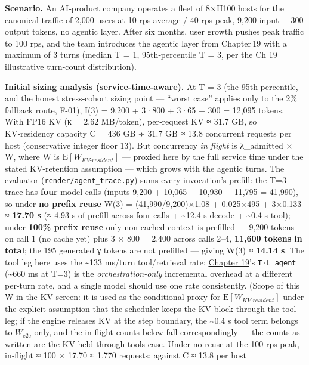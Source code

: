 \textbf{Scenario.} An AI‑product company operates a fleet of 8×H100
hosts for the canonical traffic of 2,000 users at 10 rps average / 40
rps peak, 9,200 input + 300 output tokens, no agentic layer. After six
months, user growth pushes peak traffic to 100 rps, and the team
introduces the agentic layer from Chapter\,19 with a maximum of 3 turns
(median T = 1, 95th‑percentile T = 3, per the Ch 19 illustrative
turn-count distribution).

\textbf{Initial sizing analysis (service-time-aware).} At T = 3 (the
95th‑percentile, and the honest stress‑cohort sizing point --- ``worst
case'' applies only to the 2\% fallback route, F-01), I(3) = 9,200 +
3·800 + 3·65 + 300 = 12,095 tokens. With FP16 KV (κ = 2.62 MB/token),
per‑request KV ≈ 31.7 GB, so KV‑residency capacity C = 436 GB ÷ 31.7 GB
≈ 13.8 concurrent requests per host (conservative integer floor 13). But
concurrency \emph{in flight} is λ\_admitted × W, where W is
\(\mathrm{E}[W_{KV\text{-}resident}]\) --- proxied here by the full
service time under the stated KV-retention assumption --- which grows
with the agentic turns. The evaluator (\texttt{render/agent\_trace.py})
sums every invocation's prefill: the T=3 trace has \textbf{four} model
calls (inputs 9,200 + 10,065 + 10,930 + 11,795 = 41,990), so under
\textbf{no prefix reuse} W(3) = (41,990/9,200)×1.08 + 0.025×495 +
3×0.133 ≈ \textbf{17.70 s} (≈ 4.93 s of prefill across four calls +
\textasciitilde12.4 s decode + \textasciitilde0.4 s tool); under
\textbf{100\% prefix reuse} only non-cached context is prefilled ---
9,200 tokens on call 1 (no cache yet) plus 3 × 800 = 2,400 across calls
2--4, \textbf{11,600 tokens in total}; the 195 generated γ tokens are
not prefilled --- giving W(3) ≈ \textbf{14.14 s}. The tool leg here uses
the \textasciitilde133 ms/turn tool/retrieval rate; \hyperref[chap:19]{Chapter 19}'s
\texttt{T·L\_agent} (\textasciitilde660 ms at T=3) is the
\emph{orchestration-only} incremental overhead at a different per-turn
rate, and a single model should use one rate consistently. (Scope of
this W in the KV screen: it is used as the conditional proxy for
\(\mathrm{E}[W_{KV\text{-}resident}]\) under the explicit assumption
that the scheduler keeps the KV block through the tool leg; if the
engine releases KV at the step boundary, the \textasciitilde0.4 s tool
term belongs to \(W_{\mathrm{e2e}}\) only, and the in-flight counts
below fall correspondingly --- the counts as written are the
KV-held-through-tools case. Under no-reuse at the 100‑rps peak,
in‑flight ≈ 100 × 17.70 ≈ 1,770 requests; against C ≈ 13.8 per host
